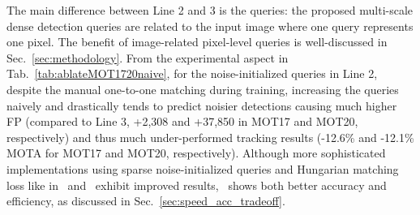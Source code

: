 \begin{table}[ht]
The main difference between Line 2 and 3 is the queries: the proposed multi-scale dense detection queries are related to the input image where one query represents one pixel. The benefit of image-related pixel-level queries is well-discussed in Sec.~\ref{sec:methodology}. From the experimental aspect in Tab.~\ref{tab:ablateMOT1720naive}, for the noise-initialized queries in Line 2, despite the manual one-to-one matching during training, increasing the queries naively and drastically tends to predict noisier detections causing much higher FP (compared to Line 3, +2,308 and +37,850 in MOT17 and MOT20, respectively) and thus much under-performed tracking results (-12.6\% and -12.1\% MOTA for MOT17 and MOT20, respectively). Although more sophisticated implementations using sparse noise-initialized queries and Hungarian matching loss like in~\cite{sun2020transtrack} and~\cite{meinhardt2021trackformer} exhibit improved results, \method\ shows both better accuracy and efficiency, as discussed in Sec.~\ref{sec:speed_acc_tradeoff}.


\end{table}
